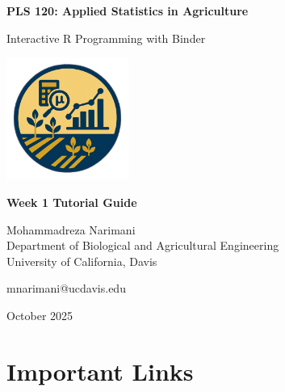\documentclass[11pt,a4paper]{article}
\begin{document}
\begin{titlepage}
    \centering
    \vspace*{2cm}
    
    {\Huge\bfseries\color{ucdblue} PLS 120: Applied Statistics in Agriculture}
    
    \vspace{1cm}
    
    {\Large\color{ucdblue} Interactive R Programming with Binder}
    
    \vspace{2cm}
    
    \includegraphics[width=0.3\textwidth]{../../images/logos/Home_Page_Logo.png}
    
    \vspace{2cm}
    
    {\large\bfseries Week 1 Tutorial Guide}
    
    \vspace{1cm}
    
    {\large Mohammadreza Narimani}\\
    {\normalsize Department of Biological and Agricultural Engineering}\\
    {\normalsize University of California, Davis}
    
    \vspace{1cm}
    
    {\normalsize mnarimani@ucdavis.edu}
    
    \vfill
    
    {\normalsize October 2025}
\end{titlepage}

\tableofcontents
\newpage

\section{Important Links}
\end{document}
